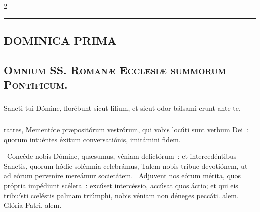 \documentclass[9pt,twoside]{extarticle}
\begin{document}
\begin{multicols}{2}
{%

\begin{center}\textcolor{red}{\rule{\linewidth}{0.5pt}} \end{center}

\subsection*{\center \textsc{DOMINICA PRIMA}}
\begin{center}\end{center}
\subsection*{\center \textsc{}}
\subsection*{\center \textsc{Omnium SS. Romanæ Ecclesiæ summorum Pontificum.}}
\subsubsection*{\center {}}

\begin{tightlist}{}
\item {} Sancti tui Dómine, florébunt sicut lílium, et sicut odor bálsami erunt ante te.
\item {}
\end{tightlist}

\subsubsection*{}
ratres, Mementóte præpositórum vestrórum, qui vobis locúti sunt verbum Dei~: quorum intuéntes éxitum conversatiónis, imitámini fidem.

\begin{tightlist}{}
\item {}~Concéde nobis Dómine, quæsumus, véniam delictórum~: et intercedéntibus Sanctis, quorum hódie solémnia celebrámus, \textred{*} Talem nobis tríbue devotiónem, ut ad eórum perveníre mereámur societátem. ~Adjuvent nos eórum mérita, quos própria impédiunt scélera~: excúset intercéssio, accúsat quos áctio; et qui eis tribuísti cœléstis palmam triúmphi, nobis véniam non déneges peccáti. alem. Glória Patri. alem.
\end{tightlist}

}
\end{multicols}
\end{document}
